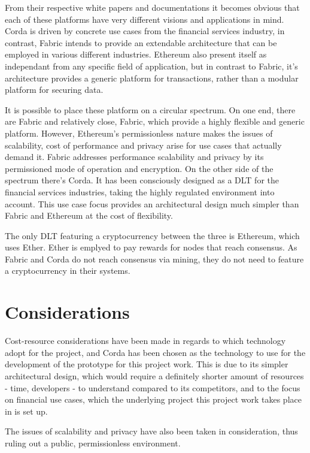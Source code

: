 From their respective white papers and documentations it becomes obvious that each of these platforms have very different visions and applications in mind.
Corda is driven by concrete use cases from the financial services industry, in contrast, Fabric intends to provide an extendable architecture that can be employed in various different industries. Ethereum also present itself as independant from any specific field of application, but in contrast to Fabric, it's architecture provides a generic platform for transactions, rather than a modular platform for securing data.

It is possible to place these platform on a circular spectrum. On one end, there are Fabric and relatively close, Fabric, which provide a highly flexible and generic platform. However, Ethereum's permissionless nature makes the issues of scalability, cost of performance and privacy arise for use cases that actually demand it. Fabric addresses performance scalability and privacy by its permissioned mode of operation and encryption.
On the other side of the spectrum there's Corda. It has been consciously designed as a DLT for the financial services industries, taking the highly regulated environment into account.
This use case focus provides an architectural design much simpler than Fabric and Ethereum at the cost of flexibility.

The only DLT featuring a cryptocurrency between the three is Ethereum, which uses Ether. Ether is emplyed to pay rewards for nodes that reach consensus. As Fabric and Corda do not reach consensus via mining, they do not need to feature a cryptocurrency in their systems.



\section{Considerations}
Cost-resource considerations have been made in regards to which technology adopt for the project, and Corda has been chosen as the technology to use for the development of the prototype for this project work. 
This is due to its simpler architectural design, which would require a definitely shorter amount of resources - time, developers - to understand compared to its competitors, and to the focus on financial use cases, which the underlying project this project work takes place in is set up.

The issues of scalability and privacy have also been taken in consideration, thus ruling out a public, permissionless environment.
